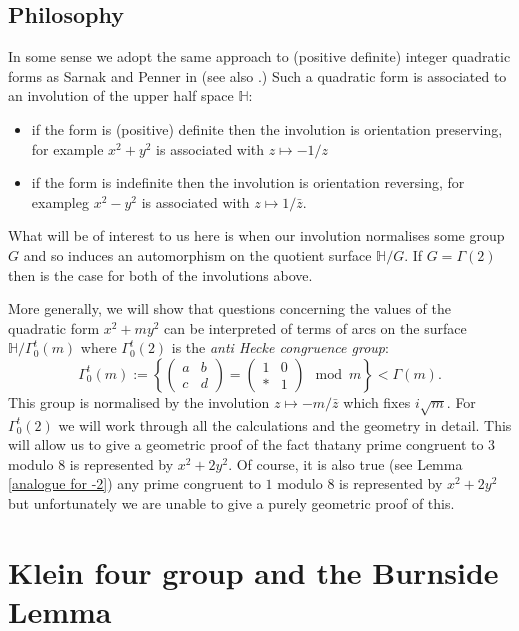 \documentclass[12pt,a4paper]{amsart}
\def\ah{\Gamma_0^t(2)}
\begin{document}
\subsection{Philosophy}


In some sense we adopt the same approach to (positive definite)
integer quadratic forms as Sarnak \cite{sarnak} and
Penner in \cite{bob} (see also \cite{springborn1}.)
Such a
quadratic form is associated to an involution of the upper half
space $\mathbb{H}$: 
\begin{itemize}
	\item if the form is (positive) definite then the
		involution is orientation preserving,
		for example  $x^2 + y^2$ is associated with $z\mapsto -1 / z$
	\item if the form is indefinite then the involution is
		orientation reversing, for exampleg $x^2 - y^2$ is
		associated with $z\mapsto 1 / \bar{z}.$
\end{itemize}
What will be of interest to us here is
when our involution normalises some group $G$
and so induces an automorphism on the quotient surface
$\mathbb{H}/G$. If $G=\Gamma(2)$ then  is the case for both of the
involutions above.

More generally, we will show that questions concerning the values of the quadratic form $x^2
+ m y^2$ can be interpreted of terms of arcs on the surface
$\mathbb{H}/\Gamma^t_0(m)$ where
$\ah$ is the 
\textit{anti Hecke congruence group}:
$$ \Gamma^t_0(m) := \left \{ \begin{pmatrix} a & b \\ c & d \end{pmatrix} = 
\begin{pmatrix} 1 & 0 \\ * & 1 \end{pmatrix} \mod m \right \} <
\Gamma(m).$$
This group is 
normalised by the involution $z\mapsto -m / \bar{z}$
which fixes $i\sqrt{m}$.
For $\Gamma^t_0(2)$  we will work through all the calculations and
the geometry in detail.
This will allow us to give a geometric proof of the fact thatany
prime congruent to $3$ modulo 8 is represented by $x^2 + 2y^2$.
Of course, it is also true (see Lemma \ref{analogue for -2})
	any
prime congruent to $1$ modulo 8 is represented by $x^2 + 2y^2$ but
unfortunately we are unable to give a purely geometric proof of
this.




\section{Klein four group and the Burnside Lemma}
\end{document}
